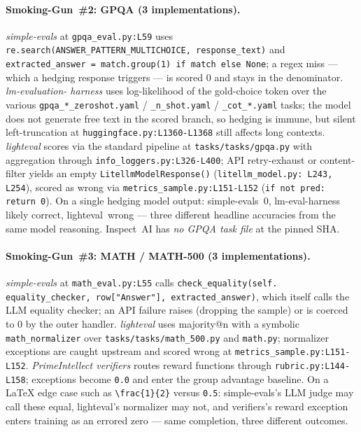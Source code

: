 \documentclass{article}
\begin{document}
\paragraph{Smoking-Gun~\#2: GPQA (3 implementations).}
\emph{simple-evals} at \texttt{gpqa\_eval.py:L59} uses
\texttt{re.search(ANSWER\_PATTERN\_MULTICHOICE, response\_text)}
and \texttt{extracted\_answer = match.group(1) if match else
None}; a regex miss --- which a hedging response triggers ---
is scored 0 and stays in the denominator. \emph{lm-evaluation-%
harness} uses log-likelihood of the gold-choice token over the
various \texttt{gpqa\_*\_zeroshot.yaml} /
\texttt{\_n\_shot.yaml} / \texttt{\_cot\_*.yaml} tasks; the
model does not generate free text in the scored branch, so
hedging is immune, but silent left-truncation at
\texttt{huggingface.py:L1360-L1368} still affects long
contexts. \emph{lighteval} scores via the standard pipeline at
\texttt{tasks/tasks/gpqa.py} with aggregation through
\texttt{info\_loggers.py:L326-L400}; API retry-exhaust or
content-filter yields an empty
\texttt{LitellmModelResponse()} (\texttt{litellm\_model.py:%
L243, L254}), scored as wrong via
\texttt{metrics\_sample.py:L151-L152} (\texttt{if not pred:
return 0}). On a single hedging model output: simple-evals~0,
lm-eval-harness likely correct, lighteval~wrong --- three
different headline accuracies from the same model reasoning.
Inspect~AI has \emph{no GPQA task file} at the pinned SHA.

\paragraph{Smoking-Gun~\#3: MATH / MATH-500 (3
implementations).} \emph{simple-evals} at
\texttt{math\_eval.py:L55} calls \texttt{check\_equality(self.%
equality\_checker, row["Answer"], extracted\_answer)}, which
itself calls the LLM equality checker; an API failure raises
(dropping the sample) or is coerced to 0 by the outer handler.
\emph{lighteval} uses majority@n with a symbolic
\texttt{math\_normalizer} over \texttt{tasks/tasks/math\_500.py}
and \texttt{math.py}; normalizer exceptions are caught upstream
and scored wrong at
\texttt{metrics\_sample.py:L151-L152}. \emph{PrimeIntellect
verifiers} routes reward functions through
\texttt{rubric.py:L144-L158}; exceptions become \texttt{0.0}
and enter the group advantage baseline. On a LaTeX edge case
such as \texttt{\textbackslash frac\{1\}\{2\}} versus
\texttt{0.5}: simple-evals's LLM judge may call these equal,
lighteval's normalizer may not, and verifiers's reward
exception enters training as an errored zero --- same
completion, three different outcomes.
\end{document}

